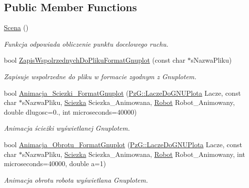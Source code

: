 \subsection*{Public Member Functions}
\begin{DoxyCompactItemize}
\item 
\hypertarget{class_scena_a8f9fe11b4cfef890123a2acc94672e17}{\hyperlink{class_scena_a8f9fe11b4cfef890123a2acc94672e17}{Scena} ()}\label{class_scena_a8f9fe11b4cfef890123a2acc94672e17}

\begin{DoxyCompactList}\small\item\em Funkcja odpowiada obliczenie punktu docelowego ruchu. \end{DoxyCompactList}\item 
bool \hyperlink{class_scena_a2a314381bd96a25eb210c2f62348205e}{Zapis\+Wspolrzednych\+Do\+Pliku\+Format\+Gnuplot} (const char $\ast$s\+Nazwa\+Pliku)
\begin{DoxyCompactList}\small\item\em Zapisuje wspolrzedne do pliku w formacie zgodnym z Gnuplotem. \end{DoxyCompactList}\item 
bool \hyperlink{class_scena_a04c424c45312771f98d823127282906e}{Animacja\+\_\+\+Sciezki\+\_\+\+Format\+Gnuplot} (\hyperlink{class_pz_g_1_1_lacze_do_g_n_u_plota}{Pz\+G\+::\+Lacze\+Do\+G\+N\+U\+Plota} Lacze, const char $\ast$s\+Nazwa\+Pliku, \hyperlink{class_sciezka}{Sciezka} Sciezka\+\_\+\+Animowana, \hyperlink{class_robot}{Robot} Robot\+\_\+\+Animowany, double dlugosc=0., int microseconds=40000)
\begin{DoxyCompactList}\small\item\em Animacja ścieżki wyświetlanej Gnuplotem. \end{DoxyCompactList}\item 
bool \hyperlink{class_scena_ac4a9a540d9a10739063568184892ad25}{Animacja\+\_\+\+Obrotu\+\_\+\+Format\+Gnuplot} (\hyperlink{class_pz_g_1_1_lacze_do_g_n_u_plota}{Pz\+G\+::\+Lacze\+Do\+G\+N\+U\+Plota} Lacze, const char $\ast$s\+Nazwa\+Pliku, \hyperlink{class_sciezka}{Sciezka} Sciezka\+\_\+\+Animowana, \hyperlink{class_robot}{Robot} Robot\+\_\+\+Animowany, int microseconds=40000, double a=1)
\begin{DoxyCompactList}\small\item\em Animacja obrotu robota wyświetlana Gnuplotem. \end{DoxyCompactList}\end{DoxyCompactItemize}
